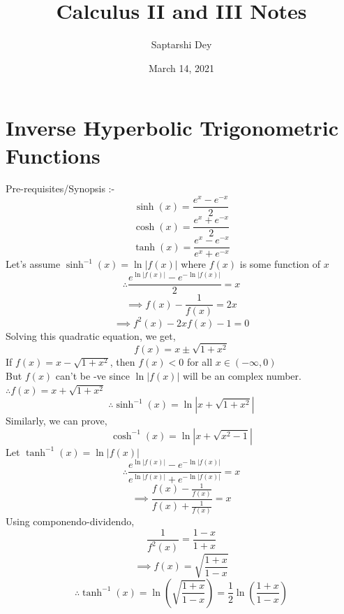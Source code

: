 \documentclass[14pt]{article}
\begin{document}
	\title{Calculus II and III Notes}
	\author{Saptarshi Dey}
	\date{March 14, 2021}
	\maketitle
	\section{Inverse Hyperbolic Trigonometric Functions}
	\large{Pre-requisites/Synopsis :-}
	\begin{equation}
		\sinh(x)=\frac{e^x-e^{-x}}{2}
	\end{equation}
	\begin{equation}
		\cosh(x)=\frac{e^x+e^{-x}}{2}
	\end{equation}
	\begin{equation}
		\tanh(x)=\frac{e^x-e^{-x}}{e^x+e^{-x}}
	\end{equation}
	Let's assume $\sinh^{-1}(x)=\ln|f(x)|$ where $f(x)$ is some function of $x$ 
	\\ \begin{equation*}
	\therefore \frac{e^{\ln|f(x)|}-e^{-\ln|f(x)|}}{2} = x	
	\end{equation*}
	\begin{equation*}					%
	\implies f(x)-\frac{1}{f(x)} = 2x		
	\end{equation*}
	\begin{equation*}
	\implies f^2(x)-2xf(x)-1 = 0		
	\end{equation*}
	Solving this quadratic equation, we get,
	\begin{equation*}
		f(x)=x\pm\sqrt{1+x^2}
	\end{equation*}
	If $f(x)=x-\sqrt{1+x^2}$, then $f(x)<0$ for all $x\in(-\infty,0)$
	\\ But $f(x)$ can't be -ve since $\ln|f(x)|$ will be an complex number.
	$\therefore f(x)=x+\sqrt{1+x^2}$
	\begin{equation}
		\therefore \boxed{\sinh^{-1}(x)=\ln|x+\sqrt{1+x^2}|}
	\end{equation}
	Similarly, we can prove,
	\begin{equation}
	\boxed{\cosh^{-1}(x)=\ln|x+\sqrt{x^2-1}|}
	\end{equation}
	Let $\tanh^{-1}(x)=\ln|f(x)|$
	\begin{equation*}
		\therefore \frac{e^{\ln|f(x)|}-e^{-\ln|f(x)|}}{e^{\ln|f(x)|}+e^{-\ln|f(x)|}}=x
	\end{equation*}
	\begin{equation*}
	\implies \frac{f(x)-\frac{1}{f(x)}}{f(x)+\frac{1}{f(x)}}=x
	\end{equation*}
	Using componendo-dividendo,
	\begin{equation*}
	\frac{1}{f^2(x)}=\frac{1-x}{1+x}
	\end{equation*}
	\begin{equation*}
	\implies f(x)=\sqrt{\frac{1+x}{1-x}}
	\end{equation*}
	\begin{equation}
	\therefore \boxed{\tanh^{-1}(x)=\ln(\sqrt{\frac{1+x}{1-x}})=\frac{1}{2}\ln(\frac{1+x}{1-x})}
	\end{equation}
\end{document}
